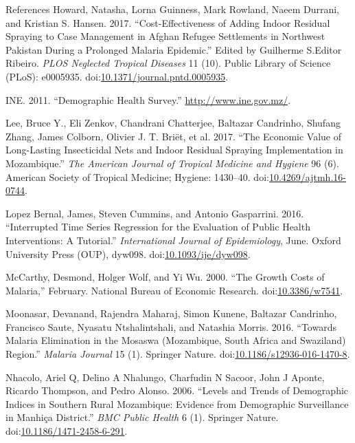 \documentclass[ignorenonframetext,]{beamer}
\begin{document}
\begin{frame}[allowframebreaks]{References}
\hypertarget{ref-Howard_2017}{}
Howard, Natasha, Lorna Guinness, Mark Rowland, Naeem Durrani, and
Kristian S. Hansen. 2017. ``Cost-Effectiveness of Adding Indoor Residual
Spraying to Case Management in Afghan Refugee Settlements in Northwest
Pakistan During a Prolonged Malaria Epidemic.'' Edited by Guilherme
S.Editor Ribeiro. \emph{PLOS Neglected Tropical Diseases} 11 (10).
Public Library of Science (PLoS): e0005935.
doi:\href{https://doi.org/10.1371/journal.pntd.0005935}{10.1371/journal.pntd.0005935}.

\hypertarget{ref-estatistica2009}{}
INE. 2011. ``Demographic Health Survey.'' \url{http://www.ine.gov.mz/}.

\hypertarget{ref-Lee2017}{}
Lee, Bruce Y., Eli Zenkov, Chandrani Chatterjee, Baltazar Candrinho,
Shufang Zhang, James Colborn, Olivier J. T. Briët, et al. 2017. ``The
Economic Value of Long-Lasting Insecticidal Nets and Indoor Residual
Spraying Implementation in Mozambique.'' \emph{The American Journal of
Tropical Medicine and Hygiene} 96 (6). American Society of Tropical
Medicine; Hygiene: 1430--40.
doi:\href{https://doi.org/10.4269/ajtmh.16-0744}{10.4269/ajtmh.16-0744}.

\hypertarget{ref-Lopez_Bernal_2016}{}
Lopez Bernal, James, Steven Cummins, and Antonio Gasparrini. 2016.
``Interrupted Time Series Regression for the Evaluation of Public Health
Interventions: A Tutorial.'' \emph{International Journal of
Epidemiology}, June. Oxford University Press (OUP), dyw098.
doi:\href{https://doi.org/10.1093/ije/dyw098}{10.1093/ije/dyw098}.

\hypertarget{ref-McCarthy_2000}{}
McCarthy, Desmond, Holger Wolf, and Yi Wu. 2000. ``The Growth Costs of
Malaria,'' February. National Bureau of Economic Research.
doi:\href{https://doi.org/10.3386/w7541}{10.3386/w7541}.

\hypertarget{ref-Moonasar_2016}{}
Moonasar, Devanand, Rajendra Maharaj, Simon Kunene, Baltazar Candrinho,
Francisco Saute, Nyasatu Ntshalintshali, and Natashia Morris. 2016.
``Towards Malaria Elimination in the Mosaswa (Mozambique, South Africa
and Swaziland) Region.'' \emph{Malaria Journal} 15 (1). Springer Nature.
doi:\href{https://doi.org/10.1186/s12936-016-1470-8}{10.1186/s12936-016-1470-8}.

\hypertarget{ref-Nhacolo_2006}{}
Nhacolo, Ariel Q, Delino A Nhalungo, Charfudin N Sacoor, John J Aponte,
Ricardo Thompson, and Pedro Alonso. 2006. ``Levels and Trends of
Demographic Indices in Southern Rural Mozambique: Evidence from
Demographic Surveillance in Manhiça District.'' \emph{BMC Public Health}
6 (1). Springer Nature.
doi:\href{https://doi.org/10.1186/1471-2458-6-291}{10.1186/1471-2458-6-291}.


\end{frame}
\end{document}
